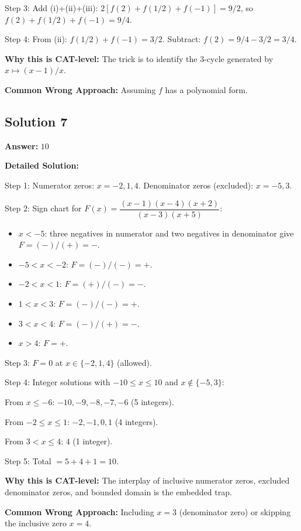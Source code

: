 \documentclass[11pt]{article}
\begin{document}
Step 3: Add (i)+(ii)+(iii): \(2[f(2)+f(1/2)+f(-1)] = 9/2\), so \(f(2)+f(1/2)+f(-1) = 9/4\).

Step 4: From (ii): \(f(1/2)+f(-1) = 3/2\). Subtract: \(f(2) = 9/4 - 3/2 = 3/4\).

\textbf{Why this is CAT-level:} The trick is to identify the 3-cycle generated by \(x\mapsto (x-1)/x\).

\textbf{Common Wrong Approach:} Assuming \(f\) has a polynomial form.

\subsection*{Solution 7}

\textbf{Answer:} \(10\)

\textbf{Detailed Solution:}

Step 1: Numerator zeros: \(x=-2, 1, 4\). Denominator zeros (excluded): \(x=-5, 3\).

Step 2: Sign chart for \(F(x)=\dfrac{(x-1)(x-4)(x+2)}{(x-3)(x+5)}\):
\begin{itemize}
\item \(x<-5\): three negatives in numerator and two negatives in denominator give \(F = (-)/( +) = -\). \checkmark
\item \(-5<x<-2\): \(F = (-)/(-) = +\).
\item \(-2<x<1\): \(F = ( +)/(-) = -\). \checkmark
\item \(1<x<3\): \(F = (-)/(-) = +\).
\item \(3<x<4\): \(F = (-)/( +) = -\). \checkmark
\item \(x>4\): \(F = +\).
\end{itemize}

Step 3: \(F=0\) at \(x \in \{-2, 1, 4\}\) (allowed).

Step 4: Integer solutions with \(-10\le x \le 10\) and \(x\notin\{-5, 3\}\):

\quad From \(x \le -6\): \(-10, -9, -8, -7, -6\) (5 integers).

\quad From \(-2 \le x \le 1\): \(-2, -1, 0, 1\) (4 integers).

\quad From \(3 < x \le 4\): \(4\) (1 integer).

Step 5: Total \(= 5 + 4 + 1 = 10\).

\textbf{Why this is CAT-level:} The interplay of inclusive numerator zeros, excluded denominator zeros, and bounded domain is the embedded trap.

\textbf{Common Wrong Approach:} Including \(x=3\) (denominator zero) or skipping the inclusive zero \(x=4\).
\end{document}
